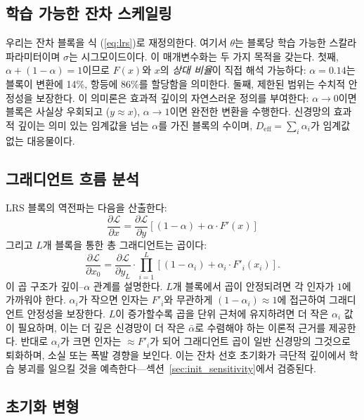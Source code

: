 \documentclass{bmvc2k}
\begin{document}
\subsection{학습 가능한 잔차 스케일링}

우리는 잔차 블록을 식 (\ref{eq:lrs})로 재정의한다. 여기서 $\theta$는 블록당 학습 가능한 스칼라 파라미터이며 $\sigma$는 시그모이드이다. 이 매개변수화는 두 가지 목적을 갖는다. 첫째, $\alpha + (1-\alpha) = 1$이므로 $F(x)$와 $x$의 \emph{상대 비율}이 직접 해석 가능하다: $\alpha = 0.14$는 블록이 변환에 14\%, 항등에 86\%를 할당함을 의미한다. 둘째, 제한된 범위는 수치적 안정성을 보장한다. 이 의미론은 효과적 깊이의 자연스러운 정의를 부여한다: $\alpha \to 0$이면 블록은 사실상 우회되고 ($y \approx x$), $\alpha \to 1$이면 완전한 변환을 수행한다. 신경망의 효과적 깊이는 의미 있는 임계값을 넘는 $\alpha$를 가진 블록의 수이며, $D_\text{eff} = \sum_i \alpha_i$가 임계값 없는 대응물이다.

\subsection{그래디언트 흐름 분석}

LRS 블록의 역전파는 다음을 산출한다:
\begin{equation}
    \frac{\partial \mathcal{L}}{\partial x} = \frac{\partial \mathcal{L}}{\partial y} \left[ (1 - \alpha) + \alpha \cdot F'(x) \right]
    \label{eq:grad}
\end{equation}
그리고 $L$개 블록을 통한 총 그래디언트는 곱이다:
\begin{equation}
    \frac{\partial \mathcal{L}}{\partial x_0} = \frac{\partial \mathcal{L}}{\partial y_L} \cdot \prod_{i=1}^{L} \left[ (1 - \alpha_i) + \alpha_i \cdot F'_i(x_i) \right].
    \label{eq:total_grad}
\end{equation}
이 곱 구조가 깊이--$\alpha$ 관계를 설명한다. $L$개 블록에서 곱이 안정되려면 각 인자가 $1$에 가까워야 한다. $\alpha_i$가 작으면 인자는 $F'_i$와 무관하게 $(1{-}\alpha_i) \approx 1$에 접근하여 그래디언트 안정성을 보장한다. $L$이 증가할수록 곱을 단위 근처에 유지하려면 더 작은 $\alpha_i$ 값이 필요하며, 이는 더 깊은 신경망이 더 작은 $\bar{\alpha}$로 수렴해야 하는 이론적 근거를 제공한다. 반대로 $\alpha_i$가 크면 인자는 $\approx F'_i$가 되어 그래디언트 곱이 일반 신경망의 그것으로 퇴화하며, 소실 또는 폭발 경향을 보인다. 이는 잔차 선호 초기화가 극단적 깊이에서 학습 붕괴를 일으킬 것을 예측한다---섹션~\ref{sec:init_sensitivity}에서 검증된다.

\subsection{초기화 변형}
\end{document}
